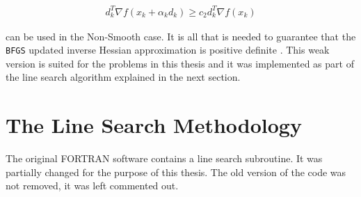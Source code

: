 \begin{equation}
  \begin{aligned}
    d_k^T \nabla f(x_k + \alpha _k d_k) \geq c_2 d_k^T \nabla f(x_k)
  \end{aligned}
\end{equation}

can be used in the Non-Smooth case. It is all that is needed to guarantee that the \texttt{BFGS} updated inverse Hessian approximation is positive definite \citep{overtonlewis}. This weak version is suited for the problems in this thesis and it was implemented as part of the line search algorithm explained in the next section.

\section{The Line Search Methodology}

The original \textsc{FORTRAN} software \citep{lbfgsbsoftware} contains a line search subroutine. It was partially changed for the purpose of this thesis. The old version of the code was not removed, it was left commented out. 





